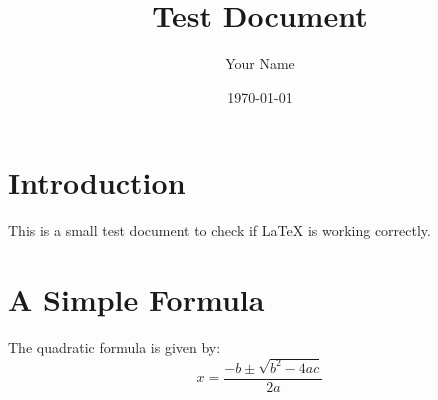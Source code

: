 \documentclass{article}
\title{Test Document}
\author{Your Name}
\date{\today}
\begin{document}
\maketitle

\section{Introduction}
This is a small test document to check if \LaTeX{} is working correctly.

\section{A Simple Formula}
The quadratic formula is given by:
\begin{equation}
    x = \frac{-b \pm \sqrt{b^2 - 4ac}}{2a}
\end{equation}
\end{document}
